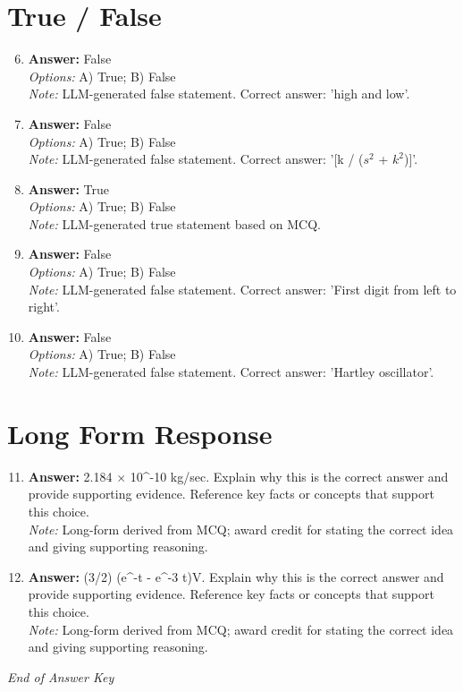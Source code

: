 \documentclass[12pt]{article}
\begin{document}
\section*{True / False}
\begin{enumerate}[label=\arabic*.]
\setcounter{enumi}{5}
\item \textbf{Answer:} False
\\ \textit{Options:} A) True; B) False
\\ \textit{Note:} LLM-generated false statement. Correct answer: 'high and low'.
\item \textbf{Answer:} False
\\ \textit{Options:} A) True; B) False
\\ \textit{Note:} LLM-generated false statement. Correct answer: '[k / ($s^2$ + $k^2$)]'.
\item \textbf{Answer:} True
\\ \textit{Options:} A) True; B) False
\\ \textit{Note:} LLM-generated true statement based on MCQ.
\item \textbf{Answer:} False
\\ \textit{Options:} A) True; B) False
\\ \textit{Note:} LLM-generated false statement. Correct answer: 'First digit from left to right'.
\item \textbf{Answer:} False
\\ \textit{Options:} A) True; B) False
\\ \textit{Note:} LLM-generated false statement. Correct answer: 'Hartley oscillator'.
\end{enumerate}

\section*{Long Form Response}
\begin{enumerate}[label=\arabic*.]
\setcounter{enumi}{10}
\item \textbf{Answer:} 2.184 \ensuremath{\times} 10^-10 kg/sec. Explain why this is the correct answer and provide supporting evidence. Reference key facts or concepts that support this choice.
\\ \textit{Note:} Long-form derived from MCQ; award credit for stating the correct idea and giving supporting reasoning.
\item \textbf{Answer:} (3/2) (e^-t - e^-3 t)V. Explain why this is the correct answer and provide supporting evidence. Reference key facts or concepts that support this choice.
\\ \textit{Note:} Long-form derived from MCQ; award credit for stating the correct idea and giving supporting reasoning.
\end{enumerate}

\vfill
\noindent\textit{End of Answer Key}
\end{document}
